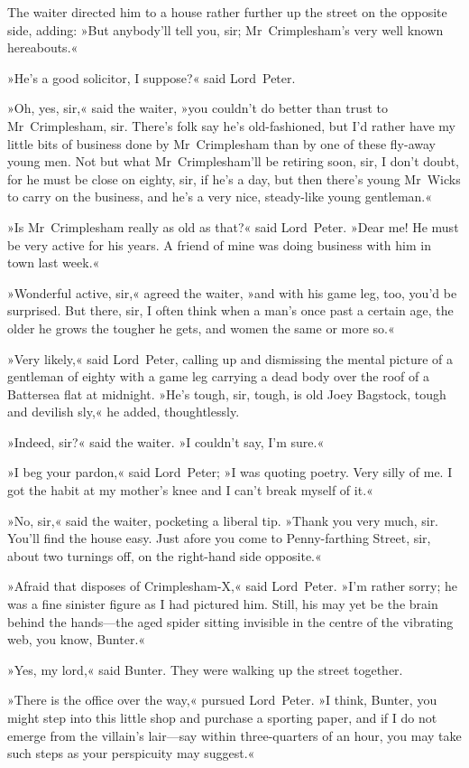The waiter directed him to a house rather further up the street on the opposite side, adding: »But anybody'll tell you, sir; Mr~Crimplesham's very well known hereabouts.«

»He's a good solicitor, I suppose?« said Lord~Peter.

»Oh, yes, sir,« said the waiter, »you couldn't do better than trust to Mr~Crimplesham, sir. There's folk say he's old-fashioned, but I'd rather have my little bits of business done by Mr~Crimplesham than by one of these fly-away young men. Not but what Mr~Crimplesham'll be retiring soon, sir, I don't doubt, for he must be close on eighty, sir, if he's a day, but then there's young Mr~Wicks to carry on the business, and he's a very nice, steady-like young gentleman.«

»Is Mr~Crimplesham really as old as that?« said Lord~Peter. »Dear me! He must be very active for his years. A friend of mine was doing business with him in town last week.«

»Wonderful active, sir,« agreed the waiter, »and with his game leg, too, you'd be surprised. But there, sir, I often think when a man's once past a certain age, the older he grows the tougher he gets, and women the same or more so.«

»Very likely,« said Lord~Peter, calling up and dismissing the mental picture of a gentleman of eighty with a game leg carrying a dead body over the roof of a Battersea flat at midnight. »He's tough, sir, tough, is old Joey Bagstock, tough and devilish sly,« he added, thoughtlessly.

»Indeed, sir?« said the waiter. »I couldn't say, I'm sure.«

»I beg your pardon,« said Lord~Peter; »I was quoting poetry. Very silly of me. I got the habit at my mother's knee and I can't break myself of it.«

»No, sir,« said the waiter, pocketing a liberal tip. »Thank you very much, sir. You'll find the house easy. Just afore you come to Penny-farthing Street, sir, about two turnings off, on the right-hand side opposite.«

»Afraid that disposes of Crimplesham-X,« said Lord~Peter. »I'm rather sorry; he was a fine sinister figure as I had pictured him. Still, his may yet be the brain behind the hands—the aged spider sitting invisible in the centre of the vibrating web, you know, Bunter.«

»Yes, my lord,« said Bunter. They were walking up the street together.

»There is the office over the way,« pursued Lord~Peter. »I think, Bunter, you might step into this little shop and purchase a sporting paper, and if I do not emerge from the villain's lair—say within three-quarters of an hour, you may take such steps as your perspicuity may suggest.«

